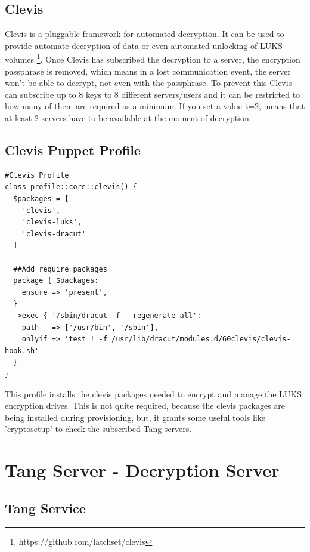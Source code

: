 \newpage
\subsection{Clevis}

Clevis is a pluggable framework for automated decryption. It can be used to provide automate decryption of data or even automated unlocking of LUKS volumes \footnote[2]{https://github.com/latchset/clevis}.
Once Clevis has subscribed the decryption to a server, the encryption passphrase is removed, which means in a lost communication event, the server won't be able to decrypt, not even with the passphrase. To prevent this Clevis can subscribe up to 8 keys to 8 different servers/users and it can be restricted to how many of them are required as a minimum. If you set a value t=2, means that at least 2 servers have to be available at the moment of decryption.


\subsection{Clevis Puppet Profile}
\begin{lstlisting}
#Clevis Profile
class profile::core::clevis() {
  $packages = [
    'clevis',
    'clevis-luks',
    'clevis-dracut'
  ]

  ##Add require packages
  package { $packages:
    ensure => 'present',
  }
  ->exec { '/sbin/dracut -f --regenerate-all':
    path   => ['/usr/bin', '/sbin'],
    onlyif => 'test ! -f /usr/lib/dracut/modules.d/60clevis/clevis-hook.sh'
  }
}
\end{lstlisting}

This profile installs the clevis packages needed to encrypt and manage the LUKS encryption drives. This is not quite required, because the clevis packages are being installed during provisioning, but, it grants some useful tools like 'cryptosetup' to check the subscribed Tang servers.

\newpage
\section{Tang Server - Decryption Server}

\subsection{Tang Service}

